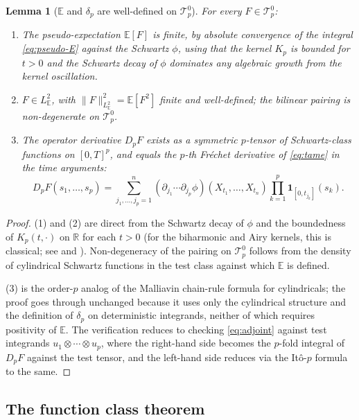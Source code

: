 \documentclass[11pt,reqno]{amsart}
\theoremstyle{plain}
\newtheorem{lemma}[theorem]{Lemma}
\theoremstyle{definition}
\newcommand{\E}{\mathbb{E}}
\newcommand{\R}{\mathbb{R}}
\begin{document}
\begin{lemma}[$\E$ and $\delta_p$ are well-defined on $\mathcal{T}_p^0$]
\label{lem:tame-welldefined}
For every $F \in \mathcal{T}_p^0$:
\begin{enumerate}
\item The pseudo-expectation $\E[F]$ is finite, by absolute convergence of the integral \eqref{eq:pseudo-E} against the Schwartz $\phi$, using that the kernel $K_p$ is bounded for $t > 0$ and the Schwartz decay of $\phi$ dominates any algebraic growth from the kernel oscillation.
\item $F \in L^2_\E$, with $\|F\|_{L^2_\E}^2 = \E[F^2]$ finite and well-defined; the bilinear pairing is non-degenerate on $\mathcal{T}_p^0$.
\item The operator derivative $D_p F$ exists as a symmetric $p$-tensor of Schwartz-class functions on $[0,T]^p$, and equals the $p$-th Fréchet derivative of \eqref{eq:tame} in the time arguments:
\begin{equation}
\label{eq:tame-Dp}
D_p F(s_1, \ldots, s_p) = \sum_{j_1, \ldots, j_p = 1}^n (\partial_{j_1} \cdots \partial_{j_p} \phi)(X_{t_1}, \ldots, X_{t_n}) \prod_{k=1}^p \mathbf{1}_{[0, t_{j_k}]}(s_k).
\end{equation}
\end{enumerate}
\end{lemma}

\begin{proof}
(1) and (2) are direct from the Schwartz decay of $\phi$ and the boundedness of $K_p(t, \cdot)$ on $\R$ for each $t > 0$ (for the biharmonic and Airy kernels, this is classical; see \cite[Ch.~II]{Hochberg1978} and \cite[\S 2]{LachalAiry}). Non-degeneracy of the pairing on $\mathcal{T}_p^0$ follows from the density of cylindrical Schwartz functions in the test class against which $\E$ is defined.

(3) is the order-$p$ analog of the Malliavin chain-rule formula for cylindricals; the proof goes through unchanged because it uses only the cylindrical structure and the definition of $\delta_p$ on deterministic integrands, neither of which requires positivity of $\E$. The verification reduces to checking \eqref{eq:adjoint} against test integrands $u_1 \otimes \cdots \otimes u_p$, where the right-hand side becomes the $p$-fold integral of $D_p F$ against the test tensor, and the left-hand side reduces via the Itô-$p$ formula to the same.
\end{proof}

\subsection{The function class theorem}
\end{document}
